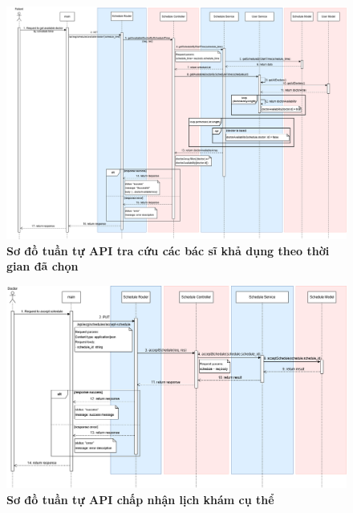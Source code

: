 \begin{figure}[H]
	\centering
	\includegraphics[width=16cm]{Images/api_sequence/schedule/getAvailableDoctorByScheduleTime.drawio.png}
	\caption[Sơ đồ tuần tự API tra cứu các bác sĩ khả dụng theo thời gian đã chọn]{\bfseries \fontsize{12pt}{0pt}\selectfont Sơ đồ tuần tự API tra cứu các bác sĩ khả dụng theo thời gian đã chọn}
	\label{sequence_diagram_get_available_with_time}
\end{figure}

\begin{figure}[H]
	\centering
	\includegraphics[width=16cm]{Images/api_sequence/schedule/acceptSchedule.drawio.png}
	\caption[Sơ đồ tuần tự API chấp nhận lịch khám cụ thể]{\bfseries \fontsize{12pt}{0pt}\selectfont Sơ đồ tuần tự API chấp nhận lịch khám cụ thể}
	\label{sequence_diagram_accept_schedule}
\end{figure}

